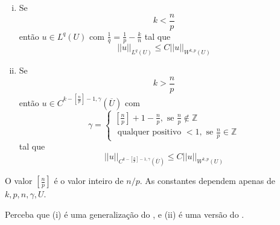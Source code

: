\documentclass[a4paper, 11pt]{article}
\newcommand{\Z}{\mathbb{Z}}
\begin{document}
\begin{enumerate}[(i)]
	\item Se \[ k < \frac{n}{p} \] então \(u \in L^q(U) \) com \( \frac{1}{q} = \frac{1}{p} - \frac{k}{n}\) tal que \[ ||u||_{L^q(U)} \leq C ||u||_{W^{k,p}(U)} \]
	
	\item Se \[ k > \frac{n}{p} \] então \(u \in C^{k- \left[\frac{n}{p}\right] - 1, \gamma}(\overline{U})\) com \[ \gamma = \begin{cases}
		\left[\frac{n}{p}\right] + 1 - \frac{n}{p}, \text{ se } \frac{n}{p} \notin\Z \\
		\text{ qualquer positivo } < 1, \text{ se } \frac{n}{p} \in \Z
	\end{cases} \] tal que \[ ||u||_{C^{k- \left[\frac{n}{p}\right] - 1, \gamma}(\overline{U})} \leq C ||u||_{W^{k,p}(U)} \]
\end{enumerate}

O valor $ \left[\frac{n}{p}\right] $ é o valor inteiro de $n/p$. As constantes dependem apenas de $k,p,n,\gamma, U$.

Perceba que (i) é uma generalização do , e (ii) é uma versão do .
\end{document}

